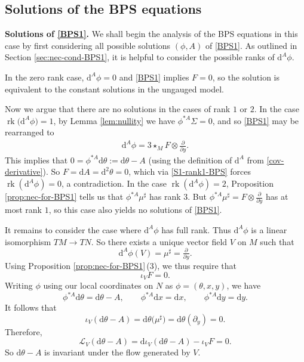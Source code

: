 \documentclass[pdftex]{sigma}
\newcommand{\1}{{\mathbb{1}}}
\newcommand{\bdy}{\partial}
\def \d{\mathrm{d}}
\newcommand{\rk}{{\operatorname{rk}}}
\numberwithin{equation}{section}
\begin{document}
\subsection{Solutions of the BPS equations}

{\bf Solutions of \eqref{BPS1}.} We shall begin the analysis of the BPS equations in this case by first considering all possible solutions $(\phi,A)$ of \eqref{BPS1}. As outlined in Section \ref{sec:nec-cond-BPS1}, it is helpful to consider the possible ranks of $\d^A\phi$.

In the zero rank case, $\d^A\phi=0$ and \eqref{BPS1} implies $F=0$, so the solution is equivalent to the constant solutions in the ungauged model.

Now we argue that there are no solutions in the cases of rank $1$ or $2$. In the case $\rk\big(\d^A\phi\big)=1$, by Lemma \ref{lem:nullity} we have $\phi^{\ast A}\Sigma=0$, and so \eqref{BPS1} may be rearranged to
\begin{align}
\label{S1-rank1-BPS}
 \d^A\phi=3\star_{M}F\otimes\frac{\bdy}{\bdy y}.
\end{align}
This implies that $0=\phi^{\ast A}\d\theta:=\d\theta - A$ (using the definition of $\d^A$ from \eqref{cov-derivative}). So $F=\d A=\d^2\theta=0$, which via \eqref{S1-rank1-BPS} forces $\rk(\d^A\phi)=0$, a contradiction. In the case $\rk(\d^A\phi)=2$, Proposition \ref{prop:nec-for-BPS1} tells us that $\phi^{\ast A}\mu^\sharp$ has rank $3$. But $\phi^{\ast A}\mu^\sharp=F\otimes\tfrac{\bdy}{\bdy y}$ has at most rank $1$, so this case also yields no solutions of \eqref{BPS1}.

It remains to consider the case where $\d^A\phi$ has full rank. Thus $\d^A\phi$ is a linear isomorphism $TM\to TN$. So there exists a unique vector field $V$ on $M$ such that
\begin{equation*}
\d^A\phi(V)=\mu^\sharp=\tfrac{\partial}{\partial y}.
\end{equation*}
Using Proposition \ref{prop:nec-for-BPS1}\,(3), we thus require that
\begin{equation*}
\iota_V F = 0.
\end{equation*}
Writing $\phi$ using our local coordinates on $N$ as $\phi=(\theta,x,y)$, we have
\begin{equation*}
\phi^{\ast A}\d\theta = \d\theta-A,\qquad\phi^{\ast A}\d x = \d x,\qquad\phi^{\ast A}\d y = \d y.
\end{equation*}
It follows that
\begin{equation*}
\iota_V (\d\theta-A) = \d\theta\big(\mu^\sharp\big) = \d\theta(\partial_y)=0.
\end{equation*}
Therefore,
\begin{equation*}
\mathcal{L}_V(\d\theta-A) = \d\iota_V(\d\theta-A) -\iota_V F = 0.
\end{equation*}
So $\d\theta-A$ is invariant under the flow generated by $V$.
\end{document}
